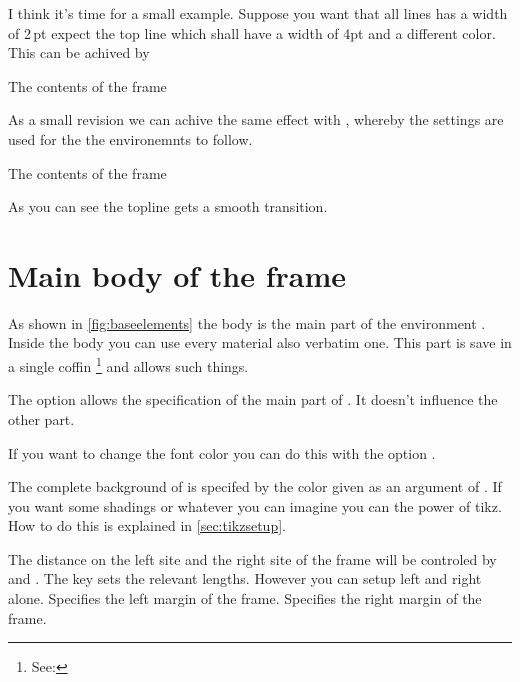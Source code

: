 \documentclass[openany,12pt,tocdepth=3]{ltx-md}
\begin{document}
I think it's time for a small example. Suppose you want that all lines has a width of
2\,pt expect the top line which shall have a width of 4pt and a different color.
This can be achived by
\begin{ltxexample}[caption=Example outer part,label=outer,result=true,]
 \begin{xframed}[line-width=2pt,line-width-top=4pt,
          line-color-top=blue]
   The contents of the frame
 \end{xframed}
\end{ltxexample}
As a small revision we can achive the same effect with , 
whereby the settings are used for the the environemnts  to follow.
\begin{ltxexample}[caption={Example outer part II},]
 \xframedsetup[line-width=2pt,line-width-top=4pt
           ,line-color-top=blue]
 \begin{xframed}
   The contents of the frame
 \end{xframed}
\end{ltxexample}

As you can see the topline gets a smooth transition. 


\section{Main body of the frame}\label{sec:element-main}
As shown in \autoref{fig:baseelements} the body is the main part of
the environment . Inside the body you can use every
material also verbatim one. This part is save in a single coffin%
\footnote{See: }  and allows such things. 

The option  allows the specification of the main part of .
It doesn't influence the other part. 

If you want to change the font color you can do this with the option .

The complete background of  is specifed by the color given
as an argument of . If you want some shadings or whatever
you can imagine you can the power of tikz. How to do this
is explained in \autoref{sec:tikzsetup}.

The distance on the left site and the right site of the frame will be 
controled by  and . The 
key  sets the relevant lengths. However you can 
setup left and right alone.
Specifies the left margin of the frame.
Specifies the right margin of the frame.
\end{document}

